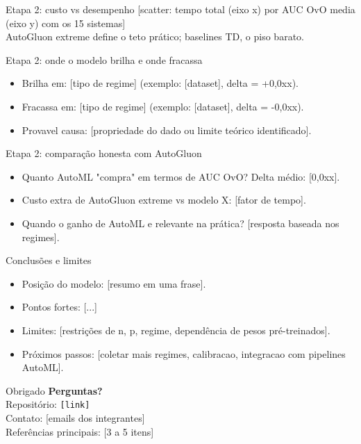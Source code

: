\documentclass[aspectratio=169,11pt]{beamer}
\begin{document}
\begin{frame}{Etapa 2: custo vs desempenho}
    \centering
    [scatter: tempo total (eixo x) por AUC OvO media (eixo y) com os 15 sistemas]
    \\[0.4em]
    \footnotesize AutoGluon extreme define o teto prático; baselines TD, o piso barato.
\end{frame}

\begin{frame}{Etapa 2: onde o modelo brilha e onde fracassa}
    \begin{itemize}
        \item Brilha em: [tipo de regime] (exemplo: [dataset], delta = +0,0xx).
        \item Fracassa em: [tipo de regime] (exemplo: [dataset], delta = -0,0xx).
        \item Provavel causa: [propriedade do dado ou limite teórico identificado].
    \end{itemize}
\end{frame}

\begin{frame}{Etapa 2: comparação honesta com AutoGluon}
    \begin{itemize}
        \item Quanto AutoML "compra" em termos de AUC OvO? Delta médio: [0,0xx].
        \item Custo extra de AutoGluon extreme vs modelo X: [fator de tempo].
        \item Quando o ganho de AutoML e relevante na prática? [resposta baseada nos regimes].
    \end{itemize}
\end{frame}

\begin{frame}{Conclusões e limites}
    \begin{itemize}
        \item Posição do modelo: [resumo em uma frase].
        \item Pontos fortes: [...]
        \item Limites: [restrições de n, p, regime, dependência de pesos pré-treinados].
        \item Próximos passos: [coletar mais regimes, calibracao, integracao com pipelines AutoML].
    \end{itemize}
\end{frame}

\begin{frame}{Obrigado}
    \centering
    \textbf{Perguntas?}
    \\[1em]
    \footnotesize
    Repositório: \texttt{[link]}\\
    Contato: [emails dos integrantes]\\
    Referências principais: [3 a 5 itens]
\end{frame}
\end{document}
